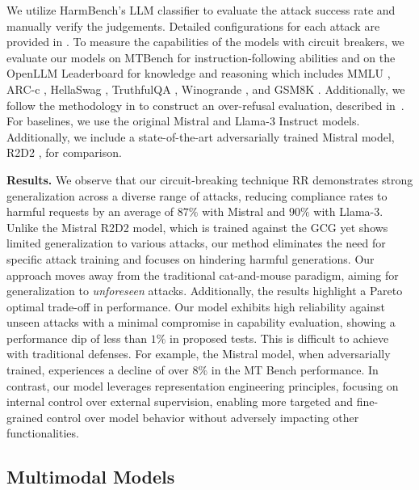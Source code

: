 We utilize HarmBench's LLM classifier to evaluate the attack success rate and manually verify the judgements. Detailed configurations for each attack are provided in . To measure the capabilities of the models with circuit breakers, we evaluate our models on MTBench \citep{zheng2023mtbench} for instruction-following abilities and on the OpenLLM Leaderboard \citep{open-llm-leaderboard} for knowledge and reasoning which includes MMLU \citep{hendrycks2020mmlu}, ARC-c \citep{clark2018think},	HellaSwag \citep{zellers2019hellaswag}, TruthfulQA \citep{lin2022truthfulqa}, Winogrande \citep{winogrande}, and GSM8K \citep{gsm8k}. Additionally, we follow the methodology in \cite{claude3_report} to construct an over-refusal evaluation, described in~. For baselines, we use the original Mistral and Llama-3 Instruct models. Additionally, we include a state-of-the-art adversarially trained Mistral model, R2D2 \citep{mazeika2024harmbench}, for comparison.


\textbf{Results.} \quad
We observe that our circuit-breaking technique RR demonstrates strong generalization across a diverse range of attacks, reducing compliance rates to harmful requests by an average of $87\%$ with Mistral and $90\%$ with Llama-3. Unlike the Mistral R2D2 model, which is trained against the GCG yet shows limited generalization to various attacks, our method eliminates the need for specific attack training and focuses on hindering harmful generations. Our approach moves away from the traditional cat-and-mouse paradigm, aiming for generalization to \emph{unforeseen} attacks. Additionally, the results highlight a Pareto optimal trade-off in performance. Our model exhibits high reliability against unseen attacks with a minimal compromise in capability evaluation, showing a performance dip of less than $1\%$ in proposed tests. This is difficult to achieve with traditional defenses. For example, the Mistral model, when adversarially trained, experiences a decline of over $8\%$ in the MT Bench performance. In contrast, our model leverages representation engineering principles, focusing on internal control over external supervision, enabling more targeted and fine-grained control over model behavior without adversely impacting other functionalities.




\subsection{Multimodal Models}

